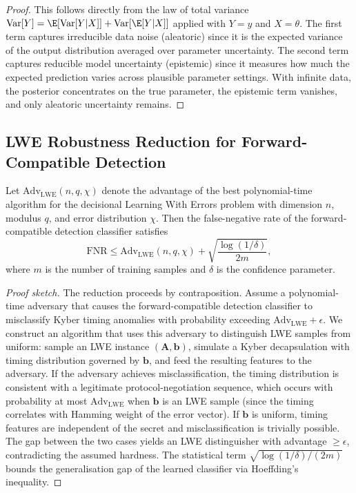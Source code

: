 \begin{proof}
This follows directly from the law of total variance $\mathrm{Var}[Y]=\E[\mathrm{Var}[Y|X]]+\mathrm{Var}[\E[Y|X]]$ applied with $Y=y$ and $X=\theta$. The first term captures irreducible data noise (aleatoric) since it is the expected variance of the output distribution averaged over parameter uncertainty. The second term captures reducible model uncertainty (epistemic) since it measures how much the expected prediction varies across plausible parameter settings. With infinite data, the posterior concentrates on the true parameter, the epistemic term vanishes, and only aleatoric uncertainty remains.
\end{proof}


\subsection{LWE Robustness Reduction for Forward-Compatible Detection}
\label{app:lwe_reduction}

\begin{proposition}
\label{prop:lwe}
Let $\mathrm{Adv}_{\mathrm{LWE}}(n,q,\chi)$ denote the advantage of the best polynomial-time algorithm for the decisional Learning With Errors problem with dimension $n$, modulus $q$, and error distribution $\chi$. Then the false-negative rate of the forward-compatible detection classifier satisfies
\begin{equation}
\mathrm{FNR} \le \mathrm{Adv}_{\mathrm{LWE}}(n,q,\chi) + \sqrt{\frac{\log(1/\delta)}{2m}},
\end{equation}
where $m$ is the number of training samples and $\delta$ is the confidence parameter.
\end{proposition}

\begin{proof}[Proof sketch]
The reduction proceeds by contraposition. Assume a polynomial-time adversary that causes the forward-compatible detection classifier to misclassify Kyber timing anomalies with probability exceeding $\mathrm{Adv}_{\mathrm{LWE}}+\epsilon$. We construct an algorithm that uses this adversary to distinguish LWE samples from uniform: sample an LWE instance $(\mathbf{A},\mathbf{b})$, simulate a Kyber decapsulation with timing distribution governed by $\mathbf{b}$, and feed the resulting features to the adversary. If the adversary achieves misclassification, the timing distribution is consistent with a legitimate protocol-negotiation sequence, which occurs with probability at most $\mathrm{Adv}_{\mathrm{LWE}}$ when $\mathbf{b}$ is an LWE sample (since the timing correlates with Hamming weight of the error vector). If $\mathbf{b}$ is uniform, timing features are independent of the secret and misclassification is trivially possible. The gap between the two cases yields an LWE distinguisher with advantage $\ge\epsilon$, contradicting the assumed hardness. The statistical term $\sqrt{\log(1/\delta)/(2m)}$ bounds the generalisation gap of the learned classifier via Hoeffding's inequality.
\end{proof}


